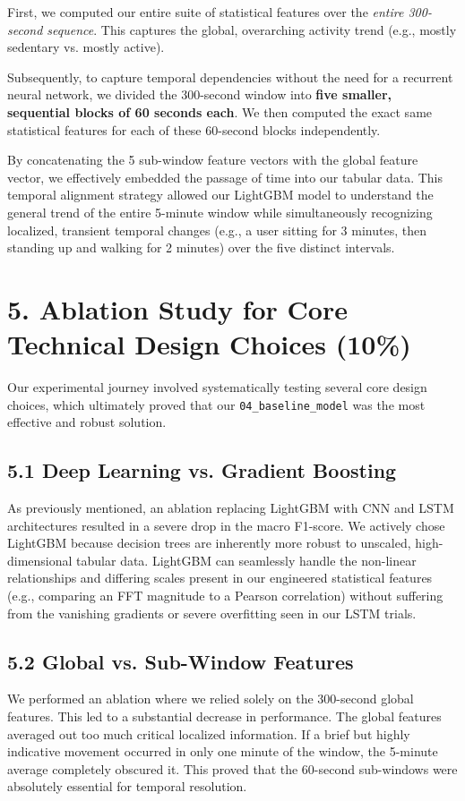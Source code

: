 \documentclass[12pt, a4paper]{article}
\begin{document}
First, we computed our entire suite of statistical features over the \textit{entire 300-second sequence}. This captures the global, overarching activity trend (e.g., mostly sedentary vs. mostly active).

Subsequently, to capture temporal dependencies without the need for a recurrent neural network, we divided the 300-second window into \textbf{five smaller, sequential blocks of 60 seconds each}. We then computed the exact same statistical features for each of these 60-second blocks independently. 

By concatenating the 5 sub-window feature vectors with the global feature vector, we effectively embedded the passage of time into our tabular data. This temporal alignment strategy allowed our LightGBM model to understand the general trend of the entire 5-minute window while simultaneously recognizing localized, transient temporal changes (e.g., a user sitting for 3 minutes, then standing up and walking for 2 minutes) over the five distinct intervals.

\section*{5. Ablation Study for Core Technical Design Choices (10\%)}

Our experimental journey involved systematically testing several core design choices, which ultimately proved that our \texttt{04\_baseline\_model} was the most effective and robust solution.

\subsection*{5.1 Deep Learning vs. Gradient Boosting}
As previously mentioned, an ablation replacing LightGBM with CNN and LSTM architectures resulted in a severe drop in the macro F1-score. We actively chose LightGBM because decision trees are inherently more robust to unscaled, high-dimensional tabular data. LightGBM can seamlessly handle the non-linear relationships and differing scales present in our engineered statistical features (e.g., comparing an FFT magnitude to a Pearson correlation) without suffering from the vanishing gradients or severe overfitting seen in our LSTM trials.

\subsection*{5.2 Global vs. Sub-Window Features}
We performed an ablation where we relied solely on the 300-second global features. This led to a substantial decrease in performance. The global features averaged out too much critical localized information. If a brief but highly indicative movement occurred in only one minute of the window, the 5-minute average completely obscured it. This proved that the 60-second sub-windows were absolutely essential for temporal resolution.
\end{document}
